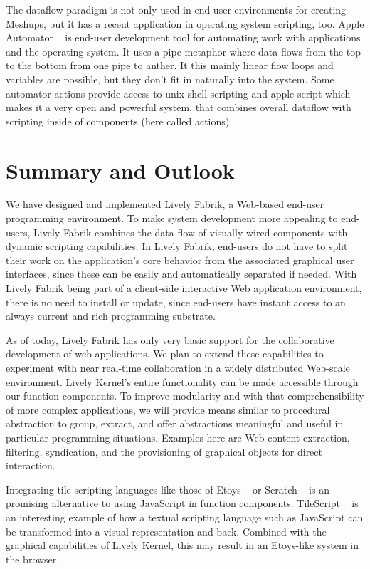 \documentclass[pdftex, times, 10pt, twocolumn]{article}
\begin{document}
The dataflow paradigm is not only used in end-user environments for creating Meshups, but it has a recent application in operating system scripting, too. Apple Automator ~\cite{AppleAutomator} is end-user development tool for automating work with applications and the operating system. It uses a pipe metaphor where data flows from the top to the bottom from one pipe to anther. It this mainly linear flow loops and variables are possible, but they don't fit in naturally into the system. Some automator actions provide access to unix shell scripting and apple script which makes it a very open and powerful system, that combines overall dataflow with scripting inside of components (here called actions). 



\section{Summary and Outlook}
We have designed and implemented Lively Fabrik, a Web-based end-user programming environment. To make system development more appealing to end-users, Lively Fabrik combines the data flow of visually wired components with dynamic scripting capabilities. In Lively Fabrik, end-users do not have to split their work on the application's core behavior from the associated graphical user interfaces, since these can be easily and automatically separated if needed. With Lively Fabrik being part of a client-side interactive Web application environment, there is no need to install or update, since end-users have instant access to an always current and rich programming substrate. 

As of today, Lively Fabrik has only very basic support for the collaborative development of web applications. We plan to extend these capabilities to experiment with near real-time collaboration in a widely distributed Web-scale environment. Lively Kernel's entire functionality can be made accessible through our function components. To improve modularity and with that comprehensibility of more complex applications, we will provide means similar to procedural abstraction to group, extract, and offer abstractions meaningful and useful in particular programming situations. Examples here are Web content extraction, filtering, syndication, and the provisioning of graphical objects for direct interaction. 

Integrating tile scripting languages like those of Etoys ~\cite{Kay2005SEA} or Scratch ~\cite{Maloney2004SSP} is an promising alternative to using JavaScript in function components. TileScript ~\cite{Warth2008TMS} is an interesting example of how a textual scripting language such as JavaScript can be transformed into a visual representation and back. Combined with the graphical capabilities of Lively Kernel, this may result in an Etoys-like system in the browser. 
\end{document}
